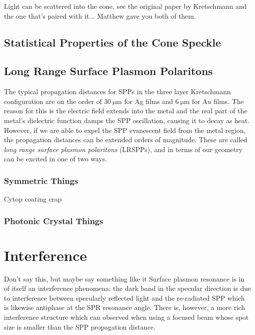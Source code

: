 \documentclass[a4paper,titlepage,onecolumn]{report}
\begin{document}
Light can be scattered into the cone, see the original paper by Kretschmann
and the one that's paired with it... Matthew gave you both of them.

\section{Statistical Properties of the Cone Speckle}

\section{Long Range Surface Plasmon Polaritons}
The typical propagation distances for SPPs in the three layer Kretschmann configuration are on the order of $\SI{30}{\micro\meter}$ for Ag films and $\SI{6}{\micro\meter}$ for Au films.  The reason for this is the electric field extends into the metal and the real part of the metal's dielectric function damps the SPP oscillation, causing it to decay as heat.  However, if we are able to expel the SPP evanescent field from the metal region, the propagation distances can be extended orders of magnitude.  These are called \textit{long range surface plasmon polaritons} (LRSPPs), and in terms of our geometry can be excited in one of two ways.
\subsection{Symmetric Things}
Cytop coating crap
\subsection{Photonic Crystal Things}

\chapter{Interference}
Don't say this, but maybe say something like it
Surface plasmon resonance is in of itself an interference phenomena: the dark band in the specular direction is due to interference between
specularly reflected light and the re-radiated SPP which is likewise
antiphase at the SPR resonance angle.  There is, however, a more rich 
interference structure which can observed when using a focused beam whose spot size is smaller than the SPP propagation distance.  
\end{document}
